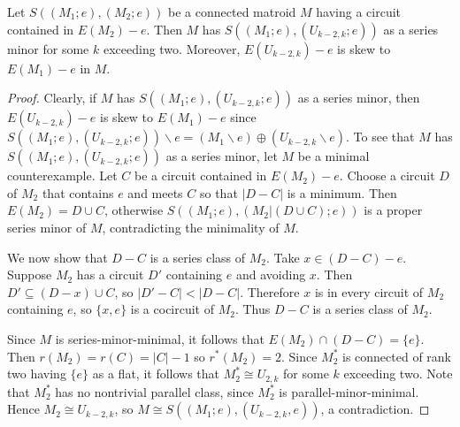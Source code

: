 \documentclass[10pt,a4paper]{amsart}
\newcommand{\del}{\backslash}
\begin{document}
\begin{lemma}\label{singlecct}
    Let $S((M_1;e),(M_2;e))$ be a connected matroid $M$ having a circuit contained in $E(M_2)-e$. Then $M$ has $S((M_1;e),(U_{k-2,k};e))$ as a series minor for some $k$ exceeding two. Moreover, $E(U_{k-2,k})-e$ is skew to $E(M_1)-e$ in $M$. 
\end{lemma}

\begin{proof}
    Clearly, if $M$ has $S((M_1;e),(U_{k-2,k};e))$ as a series minor, then $E(U_{k-2,k})-e$ is skew to $E(M_1)-e$ since $S((M_1;e),(U_{k-2,k};e))\del e=(M_1\del e)\oplus (U_{k-2,k}\del e)$.  
    To see that $M$ has $S((M_1;e),(U_{k-2,k};e))$ as a series minor, let $M$ be a minimal counterexample.
    Let $C$ be a circuit contained in $E(M_2)-e$.
    Choose a circuit $D$ of $M_2$ that contains $e$ and meets $C$ so that $|D-C|$ is a minimum. 
    Then $E(M_2)=D\cup C$, otherwise $S((M_1;e),(M_2|(D\cup C);e))$ is a proper series minor of $M$, contradicting the minimality of  $M$.  
    
    We now show that $D-C$ is a series class of $M_2$. 
    Take $x\in (D-C)-e$. Suppose $M_2$ has a circuit $D'$ containing $e$ and avoiding $x$. 
    Then $D'\subseteq (D-x)\cup C$, so $|D'-C|<|D-C|$.
    Therefore $x$ is in every circuit of $M_2$ containing $e$, so $\{x,e\}$ is a cocircuit of $M_2$. 
    Thus $D-C$ is a series class of $M_2$. 

Since $M$ is series-minor-minimal, it follows that $E(M_2)\cap (D-C)=\{e\}$. 
Then $r(M_2)=r(C)=|C|-1$ so $r^*(M_2)=2$. 
Since $M_2^*$ is connected of rank two having $\{e\}$ as a flat, it follows that $M_2^*\cong U_{2,k}$ for some $k$ exceeding two.
Note that $M_2^*$ has no nontrivial parallel class, since $M_2^*$ is parallel-minor-minimal. 
Hence $M_2\cong U_{k-2,k}$, so $M\cong S((M_1;e),(U_{k-2,k},e))$, a contradiction.   
\end{proof}
\end{document}
